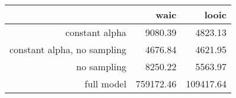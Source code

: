 \begin{table}[ht]
\centering
\begin{tabular}{rrr}
  \hline
 & waic & looic \\ 
  \hline
constant alpha & 9080.39 & 4823.13 \\ 
  constant alpha, no sampling & 4676.84 & 4621.95 \\ 
  no sampling & 8250.22 & 5563.97 \\ 
  full model & 759172.46 & 109417.64 \\ 
   \hline
\end{tabular}
\label{tab:comparison}
\end{table}
